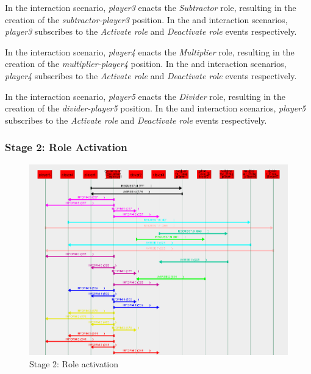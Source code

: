 In the {} interaction scenario, \textit{player3} enacts the \textit{Subtractor} role, resulting in the creation of the \textit{subtractor-player3} position.
In the {} and {} interaction scenarios, \textit{player3} subscribes to the \textit{Activate role} and \textit{Deactivate role} events respectively.

In the {} interaction scenario, \textit{player4} enacts the \textit{Multiplier} role, resulting in the creation of the \textit{multiplier-player4} position.
In the {} and {} interaction scenarios, \textit{player4} subscribes to the \textit{Activate role} and \textit{Deactivate role} events respectively.

In the {} interaction scenario, \textit{player5} enacts the \textit{Divider} role, resulting in the creation of the \textit{divider-player5} position.
In the {} and {} interaction scenarios, \textit{player5} subscribes to the \textit{Activate role} and \textit{Deactivate role} events respectively.

\subsubsection*{Stage 2: Role Activation}

\begin{figure}[H]
	\centering
	\includegraphics[width=\textwidth]{images/examples/example2-stage2.png}
	\caption{Stage 2: Role activation}
	\label{figure:example2-stage2}
\end{figure}

